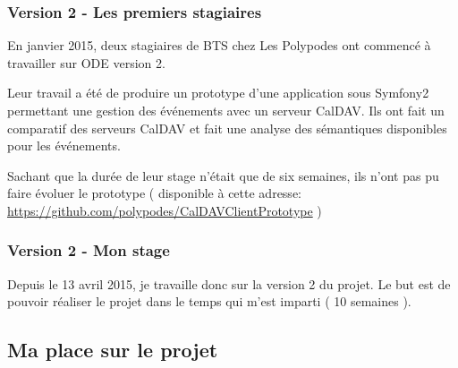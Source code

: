 \subsubsection*{Version 2 - Les premiers stagiaires}

En janvier 2015, deux stagiaires de BTS chez Les Polypodes ont commencé à travailler sur ODE version 2.

Leur travail a été de produire un prototype d'une application sous Symfony2 permettant une gestion des événements avec un serveur CalDAV. Ils ont fait un comparatif des serveurs CalDAV et fait une analyse des sémantiques disponibles pour les événements.

Sachant que la durée de leur stage n'était que de six semaines, ils n'ont pas pu faire évoluer le prototype ( disponible à cette adresse: \url{https://github.com/polypodes/CalDAVClientPrototype} )


\subsubsection*{Version 2 - Mon stage}

Depuis le 13 avril 2015, je travaille donc sur la version 2 du projet. Le but est de pouvoir réaliser le projet dans le temps qui m'est imparti ( 10 semaines ).

\subsection{Ma place sur le projet}